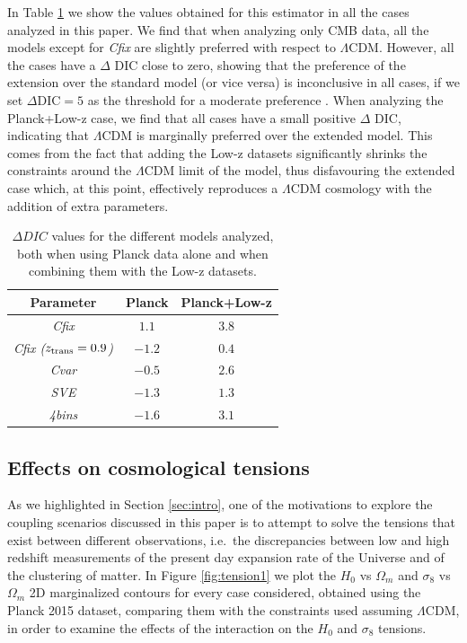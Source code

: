 \documentclass[a4paper,fleqn,usenatbib]{mnras}
\begin{document}
In Table \ref{tab:DIC} we show the values obtained for this estimator in all the cases analyzed in this paper. We find that when analyzing only CMB data, all the models except for {\it Cfix} are slightly preferred with respect to $\Lambda$CDM. However, all the cases have a $\Delta$ DIC close to zero, showing that the preference of the extension over the standard model (or vice versa) is inconclusive in all cases, if we set $\Delta \text{DIC} = 5$ as the threshold for a moderate preference \citep{Joudaki:2016kym}. When analyzing the Planck+Low-z case, we find that all cases have a small positive $\Delta$ DIC, indicating that $\Lambda$CDM is marginally preferred over the extended model. This comes from the fact that adding the Low-z datasets significantly shrinks the constraints around the $\Lambda$CDM limit of the model, thus disfavouring the extended case which, at this point, effectively reproduces a $\Lambda$CDM cosmology with the addition of extra parameters.


\begin{table}
\centering
\begin{tabular}{|c|c|c|}
\hline
Parameter                             & Planck   &  Planck+Low-z \\
\hline
\textit{Cfix}                         &  $1.1$   & $3.8$\\
\textit{Cfix ($z_{\rm trans} = 0.9$)} &  $-1.2$  & $0.4$\\
\textit{Cvar}                         &  $-0.5$  & $2.6$\\
\textit{SVE}                          &  $-1.3$  & $1.3$\\
\textit{4bins}                        &  $-1.6$  & $3.1$\\
\hline
\hline
\end{tabular}
\caption{$\Delta DIC$ values for the different models analyzed, both when using Planck data alone and when combining them with the Low-z datasets.}\label{tab:DIC}
\end{table}



\subsection{Effects on cosmological tensions}
As we highlighted in Section \ref{sec:intro}, one of the motivations to explore the coupling scenarios discussed in this paper is to attempt to solve the tensions that exist between different observations, i.e.\ the discrepancies between low and high redshift measurements of the present day expansion rate of the Universe and of the clustering of matter. In Figure \ref{fig:tension1} we plot the $H_0$ vs $\Omega_m$ and $\sigma_8$ vs $\Omega_m$ 2D marginalized contours for every case considered, obtained using the Planck 2015 dataset, comparing them with the constraints used assuming $\Lambda$CDM, in order to examine the effects of the interaction on the $H_0$ and $\sigma_8$ tensions.
\end{document}
